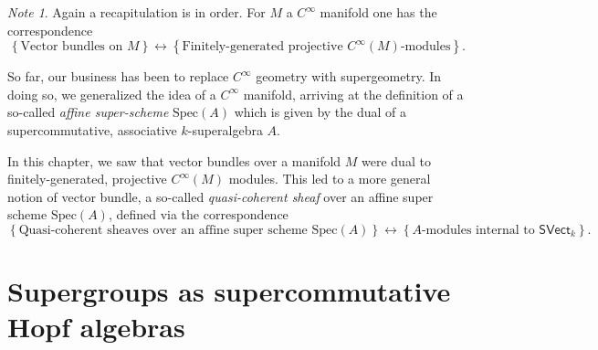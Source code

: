 \documentclass[a4paper,10pt]{scrreprt}
\newcommand{\Spec}{\mathrm{Spec}}
\theoremstyle{definition}
\theoremstyle{plain}
\theoremstyle{remark}
\newtheorem{note}{Note}[section]
\begin{document}
\begin{note}
  Again a recapitulation is in order. For $M$ a $C^{\infty}$ manifold one has the correspondence
  \begin{equation*}
    \left\{ \text{Vector bundles on $M$} \right\} \longleftrightarrow \left\{ \text{Finitely-generated projective $C^{\infty}(M)$-modules} \right\}.
  \end{equation*}

  So far, our business has been to replace $C^{\infty}$ geometry with supergeometry. In doing so, we generalized the idea of a $C^{\infty}$ manifold, arriving at the definition of a so-called \emph{affine super-scheme} $\Spec(A)$ which is given by the dual of a supercommutative, associative $k$-superalgebra $A$.

  In this chapter, we saw that vector bundles over a manifold $M$ were dual to finitely-generated, projective $C^{\infty}(M)$ modules. This led to a more general notion of vector bundle, a so-called \emph{quasi-coherent sheaf} over an affine super scheme $\Spec(A)$, defined via the correspondence
  \begin{equation*}
    \left\{ \text{Quasi-coherent sheaves over an affine super scheme $\Spec(A)$} \right\} \longleftrightarrow \left\{ \text{$A$-modules internal to $\mathsf{SVect}_{k}$} \right\}.
  \end{equation*}
\end{note}

\section{Supergroups as supercommutative Hopf algebras}
\end{document}
